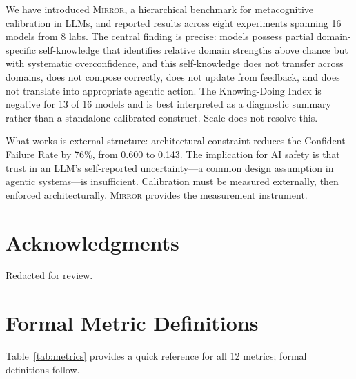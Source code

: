 \documentclass[10pt]{article}
\newcommand{\mirror}{\textsc{Mirror}}
\begin{document}
We have introduced \mirror{}, a hierarchical benchmark for metacognitive
calibration in LLMs, and reported results across eight experiments spanning 16
models from 8 labs. The central finding is precise: models possess partial domain-specific
self-knowledge that identifies relative domain strengths above chance but with
systematic overconfidence, and this self-knowledge
does not transfer across domains, does not compose correctly, does not update from
feedback, and does not translate into appropriate agentic action. The Knowing-Doing
Index is negative for 13 of 16 models and is best interpreted as a diagnostic summary rather than a standalone calibrated construct. Scale does not resolve this.

What works is external structure: architectural constraint reduces the Confident
Failure Rate by 76\%, from 0.600 to 0.143. The implication for AI safety is that
trust in an LLM's self-reported uncertainty---a common design assumption in agentic
systems---is insufficient. Calibration must be measured externally, then enforced
architecturally. \mirror{} provides the measurement instrument.

\section*{Acknowledgments}

Redacted for review.

\FloatBarrier



\newpage
\appendix

\section{Formal Metric Definitions}
\label{app:metrics}

Table~\ref{tab:metrics} provides a quick reference for all 12 metrics; formal definitions follow.
\end{document}
